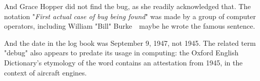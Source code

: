 And Grace Hopper did not find the bug, as she readily acknowledged that. The notation "\textit{First actual case of bug being found}" was made by a group of computer operators, including William "Bill" Burke~\textemdash~maybe he wrote the famous sentence.

And the date in the log book was September 9, 1947, not 1945. The related term "debug" also appears to predate its usage in computing: the Oxford English Dictionary's etymology of the word contains an attestation from 1945, in the context of aircraft engines.
